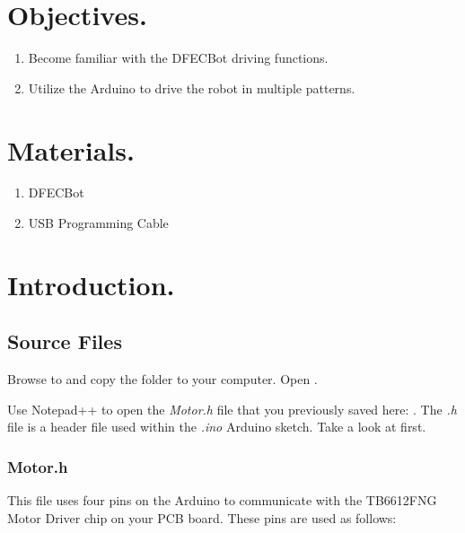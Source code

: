 \documentclass{handout}
\begin{document}
	\maketitle

	\section{Objectives.} 
	\begin{enumerate}
		\item Become familiar with the DFECBot driving functions.
		\item Utilize the Arduino to drive the robot in multiple patterns.
	\end{enumerate}
	
	\section{Materials.}
	\begin{enumerate}
		\item DFECBot
		\item USB Programming Cable
	\end{enumerate}
	
	\newpage
	\clearpage
	\pagebreak
	
	\section{Introduction.}
	
	\subsection{Source Files}
	Browse to  and copy the  folder to your computer. Open . 
	
	
	Use Notepad++ to open the \textit{Motor.h} file that you previously saved here: . The \textit{.h} file is a header file used within the \textit{.ino}  Arduino sketch. Take a look at  first.
	
	\subsubsection{Motor.h}
	This file uses four pins on the Arduino to communicate with the TB6612FNG Motor Driver chip on your PCB board. These pins are used as follows:
	
\end{document}
